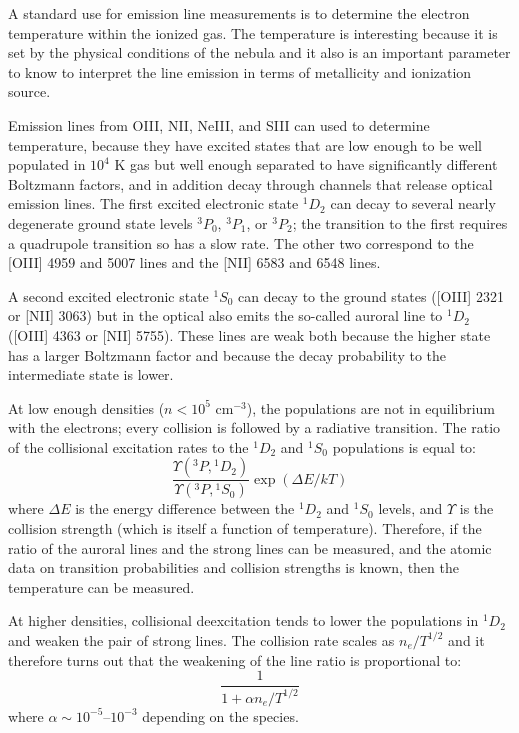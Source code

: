 A standard use for emission line measurements is to determine the
electron temperature within the ionized gas. The temperature is
interesting because it is set by the physical conditions of the nebula
and it also is an important parameter to know to interpret the line
emission in terms of metallicity and ionization source.

Emission lines from OIII, NII, NeIII, and SIII can used to determine
temperature, because they have excited states that are low enough to
be well populated in $10^4$ K gas but well enough separated to have
significantly different Boltzmann factors, and in addition decay
through channels that release optical emission lines. The first
excited electronic state ${}^{1}D_2$ can decay to several nearly
degenerate ground state levels ${}^3P_0$, ${}^3P_1$, or ${}^3P_2$; the
transition to the first requires a quadrupole transition so has a slow
rate. The other two correspond to the [OIII] 4959 and 5007 lines and
the [NII] 6583 and 6548 lines.

A second excited electronic state ${}^1S_0$ can decay to the ground
states ([OIII] 2321 or [NII] 3063) but in the optical also emits the
so-called auroral line to ${}^1D_2$ ([OIII] 4363 or [NII] 5755). These
lines are weak both because the higher state has a larger Boltzmann
factor and because the decay probability to the intermediate state is
lower. 

At low enough densities ($n<10^5$ cm$^{-3}$), the populations are not
in equilibrium with the electrons; every collision is followed by a
radiative transition.  The ratio of the collisional excitation rates
to the ${}^{1}D_2$ and ${}^1S_0$ populations is equal to:
\begin{equation}
\frac{\Upsilon({}^3P, {}^{1}D_2)}
{\Upsilon({}^3P, {}^1S_0)} \exp\left(\Delta E / kT \right)
\end{equation}
where $\Delta E$ is the energy difference between the ${}^{1}D_2$ and
${}^1S_0$ levels, and $\Upsilon$ is the collision strength (which is
itself a function of temperature). Therefore, if the ratio of the
auroral lines and the strong lines can be measured, and the atomic
data on transition probabilities and collision strengths is known,
then the temperature can be measured.

At higher densities, collisional deexcitation tends to lower the
 populations in ${}^{1}D_2$ and weaken the pair of strong lines. The
 collision rate scales as $n_e/T^{1/2}$ and it therefore turns out
 that the weakening of the line ratio is proportional to:
 \begin{equation}
\frac{1}{1 + \alpha n_e / T^{1/2}}
 \end{equation}
where $\alpha \sim 10^{-5}$--$10^{-3}$ depending on the species.

